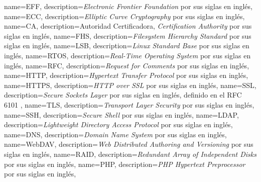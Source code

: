 {
  name=EFF,
  description={\emph{Electronic Frontier Foundation} por sus siglas en ingl\'{e}s},
}
{
  name=ECC,
  description={\emph{Elliptic Curve Cryptography} por sus siglas en ingl\'{e}s},
}
{
  name={CA},
  description={Autoridad Certificadora, \textit{Certification Authority} por sus siglas en ingl\'{e}s},
}
{
  name={FHS},
  description={\textit{Filesystem Hierarchy Standard} por sus siglas en ingl\'{e}s},
}
{
  name={LSB},
  description={\textit{Linux Standard Base} por sus siglas en ingl\'{e}s},
}
{
  name={RTOS},
  description={\textit{Real-Time Operating System} por sus siglas en ingl\'{e}s},
}
{
  name={RFC},
  description={\textit{Request for Comments} por sus siglas en ingl\'{e}s},
}
{
  name={HTTP},
  description={\textit{Hypertext Transfer Protocol} por sus siglas en ingl\'{e}s},
}
{
  name={HTTPS},
  description={\textit{HTTP over SSL} por sus siglas en ingl\'{e}s},
}
{
  name={SSL},
  description={\textit{Secure Sockets Layer} por sus siglas en ingl\'{e}s, definido en el \textsc{RFC} 6101 \cite{_rfc_????-4}},
}
{
  name={TLS},
  description={\textit{Transport Layer Security} por sus siglas en ingl\'{e}s},
}
{
  name={SSH},
  description={\textit{Secure Shell} por sus siglas en ingl\'{e}s},
}
{
  name={LDAP},
  description={\textit{Lightweight Directory Access Protocol} por sus siglas en ingl\'{e}s},
}
{
  name={DNS},
  description={\textit{Domain Name System} por sus siglas en ingl\'{e}s},
}
{
  name={WebDAV},
  description={\textit{Web Distributed Authoring and Versioning} por sus siglas en ingl\'{e}s},
}
{
  name={RAID},
  description={\textit{Redundant Array of Independent Disks} por sus siglas en ingl\'{e}s},
}
{
  name={PHP},
  description={\textit{PHP Hypertext Preprocessor} por sus siglas en ingl\'{e}s},
}
